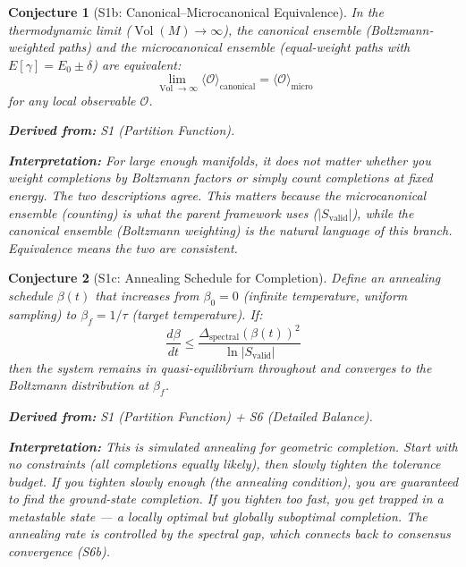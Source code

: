 \documentclass[11pt,letterpaper]{article}
\newtheorem{conjecture}{Conjecture}[section]
\newcommand{\Svalid}{S_{\mathrm{valid}}}
\newcommand{\Vol}{\operatorname{Vol}}
\begin{document}
\begin{conjecture}[S1b: Canonical--Microcanonical 
Equivalence]\label{conj:equiv}
In the thermodynamic limit ($\Vol(M) \to \infty$), the canonical ensemble 
(Boltzmann-weighted paths) and the microcanonical ensemble (equal-weight 
paths with $E[\gamma] = E_0 \pm \delta$) are equivalent:
\begin{equation}
    \lim_{\Vol \to \infty} 
    \langle \mathcal{O} \rangle_{\mathrm{canonical}} 
    = \langle \mathcal{O} \rangle_{\mathrm{micro}}
\end{equation}
for any local observable $\mathcal{O}$.

\textbf{Derived from:} S1 (Partition Function).

\textbf{Interpretation:} For large enough manifolds, it does not matter 
whether you weight completions by Boltzmann factors or simply count 
completions at fixed energy. The two descriptions agree. This matters 
because the microcanonical ensemble (counting) is what the parent 
framework uses ($|\Svalid|$), while the canonical ensemble (Boltzmann 
weighting) is the natural language of this branch. Equivalence means the 
two are consistent.
\end{conjecture}

\begin{conjecture}[S1c: Annealing Schedule for 
Completion]\label{conj:annealing}
Define an annealing schedule $\beta(t)$ that increases from $\beta_0 = 0$ 
(infinite temperature, uniform sampling) to $\beta_f = 1/\tau$ (target 
temperature). If:
\begin{equation}
    \frac{d\beta}{dt} \leq \frac{\Delta_{\mathrm{spectral}}(\beta(t))^2}
    {\ln |\Svalid|}
\end{equation}
then the system remains in quasi-equilibrium throughout and converges to 
the Boltzmann distribution at $\beta_f$.

\textbf{Derived from:} S1 (Partition Function) + S6 (Detailed Balance).

\textbf{Interpretation:} This is simulated annealing for geometric 
completion. Start with no constraints (all completions equally likely), 
then slowly tighten the tolerance budget. If you tighten slowly enough 
(the annealing condition), you are guaranteed to find the ground-state 
completion. If you tighten too fast, you get trapped in a metastable 
state --- a locally optimal but globally suboptimal completion. The 
annealing rate is controlled by the spectral gap, which connects back to 
consensus convergence (S6b).
\end{conjecture}
\end{document}
